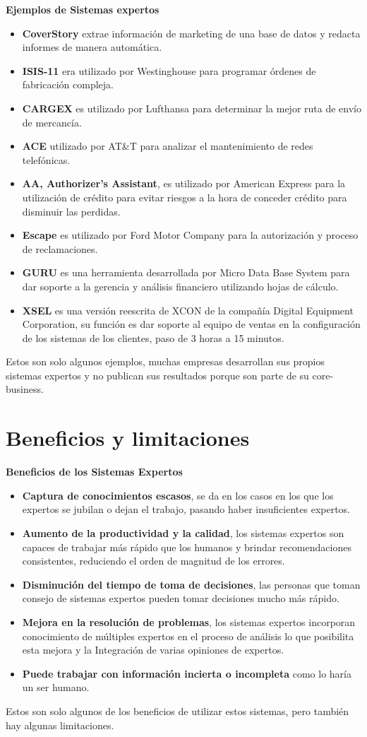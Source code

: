 \documentclass[12pt, twoside, openright]{report} %
\begin{document}
\textbf{Ejemplos de Sistemas expertos}
\begin{itemize}
	\item \textbf{CoverStory} extrae información de marketing de una base de datos y redacta informes de manera automática.
	\item \textbf{ISIS-11} era utilizado por Westinghouse para programar órdenes de fabricación compleja.
	\item \textbf{CARGEX} es utilizado por Lufthansa para determinar la mejor ruta de envío de mercancía.
	\item \textbf{ACE} utilizado por AT\&T para analizar el mantenimiento de redes telefónicas.
	\item \textbf{AA, Authorizer’s Assistant}, es utilizado por American Express para la utilización de crédito para evitar riesgos a la hora de conceder crédito para disminuir las perdidas.
	\item \textbf{Escape} es utilizado por Ford Motor Company para la autorización y proceso de reclamaciones.
	\item \textbf{GURU} es una herramienta desarrollada por Micro Data Base System para dar soporte a la gerencia y análisis financiero utilizando hojas de cálculo.
	\item \textbf{XSEL} es una versión reescrita de XCON de la compañía Digital Equipment Corporation, su función es dar soporte al equipo de ventas en la configuración de los sistemas de los clientes, paso de 3 horas a 15 minutos.
\end{itemize}

Estos son solo algunos ejemplos, muchas empresas desarrollan sus propios sistemas expertos y no publican sus resultados porque son parte de su core-business.

\section{Beneficios y limitaciones}
\textbf{Beneficios de los Sistemas Expertos}
\begin{itemize}
	\item \textbf{Captura de conocimientos escasos}, se da en los casos en los que los expertos se jubilan o dejan el trabajo, pasando haber insuficientes expertos.
	\item \textbf{Aumento de la productividad y la calidad}, los sistemas expertos son capaces de trabajar más rápido que los humanos y brindar recomendaciones consistentes, reduciendo el orden de magnitud de los errores.
	\item \textbf{Disminución del tiempo de toma de decisiones}, las personas que toman consejo de sistemas expertos pueden tomar decisiones mucho más rápido.
	\item \textbf{Mejora en la resolución de problemas}, los sistemas expertos incorporan conocimiento de múltiples expertos en el proceso de análisis lo que posibilita esta mejora y la Integración de varias opiniones de expertos.
	\item \textbf{Puede trabajar con información incierta o incompleta} como lo haría un ser humano.
\end{itemize}
Estos son solo algunos de los beneficios de utilizar estos sistemas, pero también hay algunas limitaciones.
\end{document}
